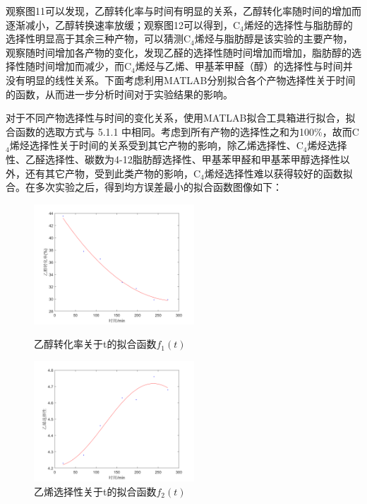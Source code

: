 \documentclass[a4paper,10.5pt]{ctexart}
\begin{document}
观察图11可以发现，乙醇转化率与时间有明显的关系，乙醇转化率随时间的增加而逐渐减小，乙醇转换速率放缓；观察图12可以得到，C$_4$烯烃的选择性与脂肪醇的选择性明显高于其余三种产物，可以猜测C$_4$烯烃与脂肪醇是该实验的主要产物，观察随时间增加各产物的变化，发现乙醛的选择性随时间增加而增加，脂肪醇的选择性随时间增加而减少，而C$_4$烯烃与乙烯、甲基苯甲醛（醇）的选择性与时间并没有明显的线性关系。下面考虑利用MATLAB分别拟合各个产物选择性关于时间的函数，从而进一步分析时间对于实验结果的影响。

对于不同产物选择性与时间的变化关系，使用MATLAB拟合工具箱进行拟合，拟合函数的选取方式与 5.1.1 中相同。考虑到所有产物的选择性之和为100\%，故而C$_4$烯烃选择性关于时间的关系受到其它产物的影响，除乙烯选择性、C$_4$烯烃选择性、乙醛选择性、碳数为4-12脂肪醇选择性、甲基苯甲醛和甲基苯甲醇选择性以外，还有其它产物，受到此类产物的影响，C$_4$烯烃选择性难以获得较好的函数拟合。在多次实验之后，得到均方误差最小的拟合函数图像如下：
\begin{figure}[h]
\centering
\begin{minipage}[t]{0.48\textwidth}
\centering
\includegraphics[width=6cm]{time-乙醇.png}
\caption{乙醇转化率关于t的拟合函数$f_1(t)$}
\end{minipage}
\begin{minipage}[t]{0.48\textwidth}
\centering
\includegraphics[width=6cm]{time-乙烯.png}
\caption{乙烯选择性关于t的拟合函数$f_2(t)$}
\end{minipage}
\end{figure}
\end{document}
